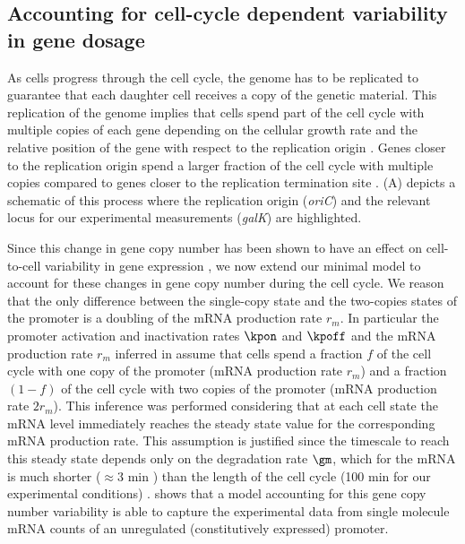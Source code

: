 \subsection{Accounting for cell-cycle dependent variability in gene dosage}
\label{sec_cell_cycle}

As cells progress through the cell cycle, the genome has to be replicated to
guarantee that each daughter cell receives a copy of the genetic material. This
replication of the genome implies that cells spend part of the cell cycle with
multiple copies of each gene depending on the cellular growth rate and the
relative position of the gene with respect to the replication origin
\cite{Bremer1996}. Genes closer to the replication origin spend a larger
fraction of the cell cycle with multiple copies compared to genes closer to the
replication termination site \cite{Bremer1996}. (A)
depicts a schematic of this process where the replication origin ({\it oriC})
and the relevant locus for our experimental measurements ({\it galK}) are
highlighted.

Since this change in gene copy number has been shown to have an effect on
cell-to-cell variability in gene expression \cite{Jones2014a, Peterson2015}, we
now extend our minimal model to account for these changes in gene copy number
during the cell cycle.  We reason that the only difference between the
single-copy state and the two-copies states of the promoter is a doubling of
the mRNA production rate $r_m$. In particular the promoter activation and
inactivation rates $\kpon$ and $\kpoff$ and the mRNA production rate $r_m$
inferred in  assume that cells spend a fraction $f$ of the
cell cycle  with one copy of the promoter (mRNA production rate $r_m$) and a
fraction $(1-f)$ of the cell cycle with two copies of the promoter (mRNA
production rate $2 r_m$). This inference was performed considering that at each
cell state the mRNA level immediately reaches the steady state value for the
corresponding mRNA production rate. This assumption is justified since the
timescale to reach this steady state depends only on the degradation rate
$\gm$, which for the mRNA  is much shorter ($\approx 3$ min ) than the length
of the cell cycle (100 min for our experimental conditions) \cite{Dong1995}.
 shows that a model accounting for this gene copy
number variability is able to capture the experimental data from single
molecule mRNA counts of an unregulated (constitutively expressed) promoter.

